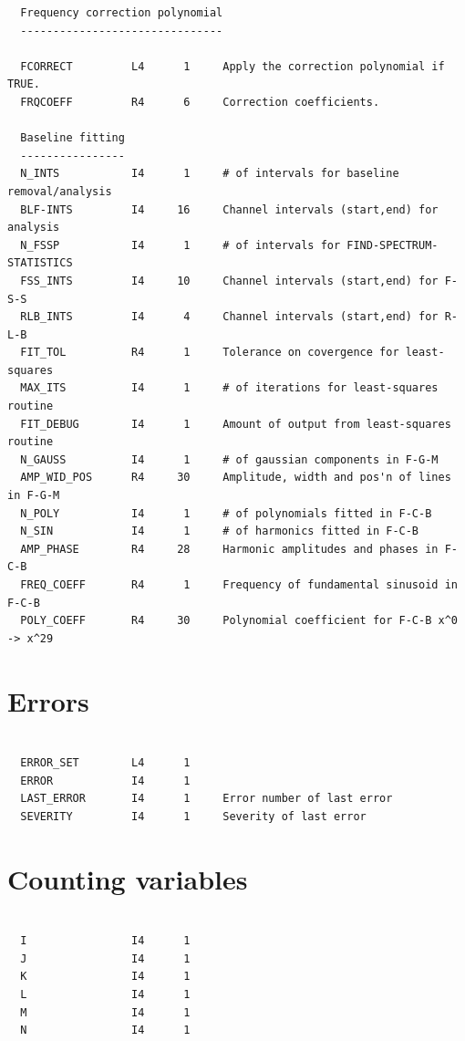 \documentclass[11pt,twoside]{report}
\begin{document}
\begin{verbatim}
  Frequency correction polynomial
  -------------------------------

  FCORRECT         L4      1     Apply the correction polynomial if TRUE.
  FRQCOEFF         R4      6     Correction coefficients.

  Baseline fitting
  ----------------
  N_INTS           I4      1     # of intervals for baseline removal/analysis
  BLF-INTS         I4     16     Channel intervals (start,end) for analysis
  N_FSSP           I4      1     # of intervals for FIND-SPECTRUM-STATISTICS
  FSS_INTS         I4     10     Channel intervals (start,end) for F-S-S
  RLB_INTS         I4      4     Channel intervals (start,end) for R-L-B
  FIT_TOL          R4      1     Tolerance on covergence for least-squares
  MAX_ITS          I4      1     # of iterations for least-squares routine
  FIT_DEBUG        I4      1     Amount of output from least-squares routine
  N_GAUSS          I4      1     # of gaussian components in F-G-M
  AMP_WID_POS      R4     30     Amplitude, width and pos'n of lines in F-G-M
  N_POLY           I4      1     # of polynomials fitted in F-C-B
  N_SIN            I4      1     # of harmonics fitted in F-C-B
  AMP_PHASE        R4     28     Harmonic amplitudes and phases in F-C-B
  FREQ_COEFF       R4      1     Frequency of fundamental sinusoid in F-C-B
  POLY_COEFF       R4     30     Polynomial coefficient for F-C-B x^0 -> x^29

\end{verbatim}
\section{Errors}
\begin{verbatim}

  ERROR_SET        L4      1
  ERROR            I4      1
  LAST_ERROR       I4      1     Error number of last error
  SEVERITY         I4      1     Severity of last error

\end{verbatim}
\section{Counting variables}
\begin{verbatim}

  I                I4      1
  J                I4      1
  K                I4      1
  L                I4      1
  M                I4      1
  N                I4      1

\end{verbatim}
\end{document}
